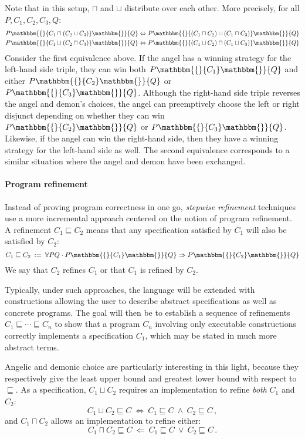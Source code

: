 \documentclass[sigplan,10pt,review,anonymous]{acmart}
\newcommand{\htr}[3]{{ {#1} \mathbbm{\{} {#2} \mathbbm{\}} {#3} }}
\begin{document}
Note that in this setup,
$\sqcap$ and $\sqcup$ distribute over each other.
More precisely, for all $P, C_1, C_2, C_3, Q$:
\begin{align*}
  \htr{P}{C_1 \sqcap (C_2 \sqcup C_3)}{Q} &\Leftrightarrow
    \htr{P}{(C_1 \sqcap C_2) \sqcup (C_1 \sqcap C_3)}{Q} \\
  \htr{P}{C_1 \sqcup (C_2 \sqcap C_3)}{Q} &\Leftrightarrow
    \htr{P}{(C_1 \sqcup C_2) \sqcap (C_1 \sqcup C_3)}{Q}
\end{align*}
Consider the first equivalence above.
If the angel has a winning strategy for
the left-hand side triple,
they can win both $\htr{P}{C_1}{Q}$
and either $\htr{P}{C_2}{Q}$ or $\htr{P}{C_3}{Q}$.
Although the right-hand side triple
reverses the angel and demon's choices,
the angel can preemptively choose the left or right
disjunct depending on whether they can win
$\htr{P}{C_2}{Q}$ or $\htr{P}{C_3}{Q}$.
Likewise, if the angel can win the right-hand side,
then they have a winning strategy for the left-hand side as well.
The second equivalence corresponds to a similar situation
where the angel and demon have been exchanged.


\paragraph{Program refinement} %

Instead of proving program correctness in one go,
\emph{stepwise refinement} techniques use a more incremental approach
centered on the notion of program refinement.
A refinement $C_1 \sqsubseteq C_2$
means that any specification satisfied by $C_1$
will also be satisfied by $C_2$:
\[
    C_1 \sqsubseteq C_2 \: := \:
    \forall P Q \cdot
      \htr{P}{C_1}{Q} \Rightarrow
      \htr{P}{C_2}{Q}
\]
We say that $C_2$ refines $C_1$
or that $C_1$ is refined by $C_2$.

Typically,
under such approaches,
the language will be extended with constructions
allowing the user to describe
abstract specifications as well as
concrete programs.
The goal will then be to establish
a sequence of refinements
$C_1 \sqsubseteq \cdots \sqsubseteq C_n$
to show that a program $C_n$ involving
only executable constructions
correctly implements a specification $C_1$,
which may be stated in much more abstract terms.

Angelic and demonic choice
are particularly interesting in this light,
because they respectively give the
least upper bound and greatest lower bound
with respect to $\sqsubseteq$.
As a specification, $C_1 \sqcup C_2$
requires an implementation to refine
\emph{both} $C_1$ and $C_2$:
\[
    C_1 \sqcup C_2 \sqsubseteq C \: \Leftrightarrow \:
    C_1 \sqsubseteq C \: \wedge \: C_2 \sqsubseteq C \,,
\]
and $C_1 \sqcap C_2$
allows an implementation to refine
either:
\[
    C_1 \sqcap C_2 \sqsubseteq C \: \Leftarrow \:
    C_1 \sqsubseteq C \: \vee \: C_2 \sqsubseteq C \,.
\]
\end{document}
